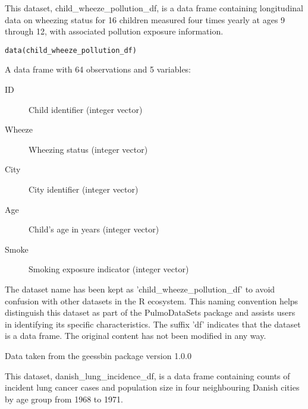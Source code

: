 \documentclass[a4paper]{book}
\begin{document}
%
\begin{Description}
This dataset, child\_wheeze\_pollution\_df, is a data frame containing longitudinal data
on wheezing status for 16 children measured four times yearly at ages 9 through 12,
with associated pollution exposure information.
\end{Description}
%
\begin{Usage}
\begin{verbatim}
data(child_wheeze_pollution_df)
\end{verbatim}
\end{Usage}
%
\begin{Format}
A data frame with 64 observations and 5 variables:
\begin{description}

\item[ID] Child identifier (integer vector)
\item[Wheeze] Wheezing status (integer vector)
\item[City] City identifier (integer vector)
\item[Age] Child's age in years (integer vector)
\item[Smoke] Smoking exposure indicator (integer vector)

\end{description}

\end{Format}
%
\begin{Details}
The dataset name has been kept as 'child\_wheeze\_pollution\_df' to avoid confusion with other datasets
in the R ecosystem. This naming convention helps distinguish this dataset as part of the
PulmoDataSets package and assists users in identifying its specific characteristics.
The suffix 'df' indicates that the dataset is a data frame. The original content has not been modified
in any way.
\end{Details}
%
\begin{Source}
Data taken from the geessbin package version 1.0.0
\end{Source}
%
\begin{Description}
This dataset, danish\_lung\_incidence\_df, is a data frame containing counts of
incident lung cancer cases and population size in four neighbouring Danish cities
by age group from 1968 to 1971.
\end{Description}
\end{document}
